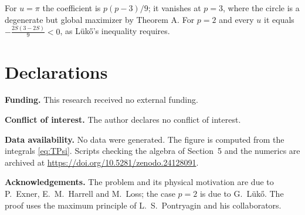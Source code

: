 \documentclass[11pt]{amsart}
\theoremstyle{definition}
\theoremstyle{remark}
\begin{document}
For $u=\pi$ the coefficient is $p(p-3)/9$; it vanishes at $p=3$, where the circle is a degenerate but global maximizer by Theorem A. For $p=2$ and every $u$ it equals $-\frac{2S(3-2S)}9<0$, as Lük\H{o}'s inequality requires.

\section*{Declarations}

\noindent\textbf{Funding.} This research received no external funding.

\noindent\textbf{Conflict of interest.} The author declares no conflict of interest.

\noindent\textbf{Data availability.} No data were generated. The figure is computed from the integrals \eqref{eq:TPsi}. Scripts checking the algebra of Section~5 and the numerics are archived at \url{https://doi.org/10.5281/zenodo.24128091}.

\noindent\textbf{Acknowledgements.} The problem and its physical motivation are due to P.~Exner, E.~M.~Harrell and M.~Loss; the case $p=2$ is due to G.~Lük\H{o}. The proof uses the maximum principle of L.~S.~Pontryagin and his collaborators.
\end{document}

